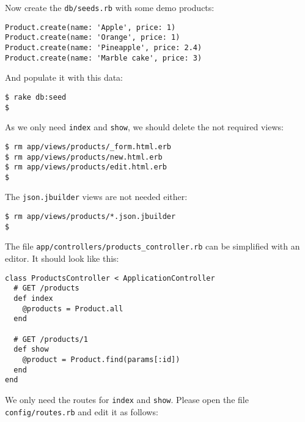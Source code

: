 \documentclass[a4paper]{book}
\begin{document}
Now create the \texttt{db/seeds.rb} with some demo products:

\begin{shaded}\begin{verbatim}
Product.create(name: 'Apple', price: 1)
Product.create(name: 'Orange', price: 1)
Product.create(name: 'Pineapple', price: 2.4)
Product.create(name: 'Marble cake', price: 3)
\end{verbatim}\end{shaded}

And populate it with this data:

\begin{shaded}\begin{verbatim}
$ rake db:seed
$
\end{verbatim}\end{shaded}

As we only need \texttt{index} and \texttt{show}, we should delete the not required views:

\begin{shaded}\begin{verbatim}
$ rm app/views/products/_form.html.erb
$ rm app/views/products/new.html.erb
$ rm app/views/products/edit.html.erb
$
\end{verbatim}\end{shaded}

The \texttt{json.jbuilder} views are not needed either:

\begin{shaded}\begin{verbatim}
$ rm app/views/products/*.json.jbuilder
$
\end{verbatim}\end{shaded}

The file \texttt{app/controllers/products\_controller.rb} can be simplified with an editor. It should look like this:

\begin{shaded}\begin{verbatim}
class ProductsController < ApplicationController
  # GET /products
  def index
    @products = Product.all
  end

  # GET /products/1
  def show
    @product = Product.find(params[:id])
  end
end
\end{verbatim}\end{shaded}

We only need the routes for \texttt{index} and \texttt{show}. Please open the file \texttt{config/routes.rb} and edit it as follows:
\end{document}
